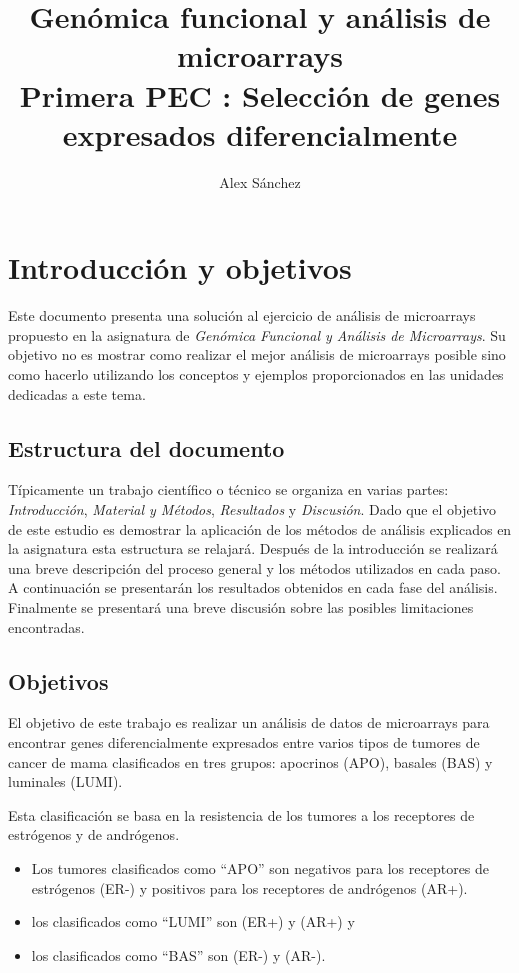 \documentclass[a4paper]{article}\usepackage[]{graphicx}\usepackage[]{color}
\title{Genómica funcional y análisis de microarrays\\
  Primera PEC : Selección de genes expresados diferencialmente}
\author{Alex Sánchez}
\begin{document}

\maketitle

\tableofcontents

\section{Introducción y objetivos}

Este documento presenta una solución al ejercicio de análisis de microarrays propuesto en la asignatura de \emph{Genómica Funcional y Análisis de Microarrays}. Su objetivo no es mostrar como realizar el mejor análisis de microarrays posible sino como hacerlo utilizando los conceptos y ejemplos proporcionados en las unidades dedicadas a este tema.

\subsection{Estructura del documento}

Típicamente un trabajo científico o técnico se organiza en varias partes: \emph{Introducción}, \emph{Material y Métodos}, \emph{Resultados} y \emph{Discusión}. Dado que el objetivo de este estudio es demostrar la aplicación de los métodos de análisis explicados en la asignatura esta estructura se relajará. Después de la introducción se realizará una breve descripción del proceso general y los métodos utilizados en cada paso. A continuación se presentarán los resultados obtenidos en cada fase del análisis. Finalmente se presentará una breve discusión sobre las posibles limitaciones encontradas.

\subsection{Objetivos}

El objetivo de este trabajo es realizar un análisis de datos de microarrays 
para encontrar genes diferencialmente expresados entre varios tipos de tumores de cancer de mama clasificados en tres grupos: apocrinos (APO), basales (BAS) y luminales (LUMI). 

Esta clasificación se basa en la resistencia de los tumores a los receptores de estrógenos y de andrógenos. 
\begin{itemize}
\item Los tumores clasificados como ``APO'' son negativos para los receptores de estrógenos (ER-) y positivos para los receptores de andrógenos (AR+).
\item  los clasificados como ``LUMI'' son (ER+) y (AR+) y
\item los clasificados como ``BAS'' son (ER-) y (AR-).
\end{itemize}
\end{document}
